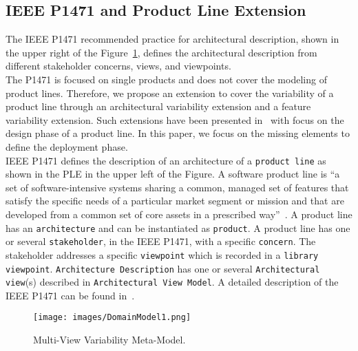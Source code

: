 \documentclass{llncs}
\begin{document}
\subsection{IEEE P1471 and Product Line Extension}
The IEEE P1471 recommended practice for architectural description, shown in the upper right of the Figure~\ref{MM}, defines the architectural description from different stakeholder concerns, views, and viewpoints.\\
The P1471 is focused on single products and does not cover the modeling of product lines. Therefore, we propose an extension to cover the variability of a product line through an architectural variability extension and a feature variability extension. Such extensions have been presented in~\cite{thiel2002systematic} with focus on the design phase of a product line. In this paper, we focus on the missing elements to define the deployment phase.\\
IEEE P1471 defines the description of an architecture of a \texttt{product line} as shown in the PLE in the upper left of the Figure. A software product line is ``a set of software-intensive systems sharing a common, managed set of features that satisfy the specific needs of a particular market segment or mission and that are developed from a common set of core assets in a prescribed way''~\cite{clements2002software}. A product line has an \texttt{architecture} and can be instantiated as \texttt{product}. A product line has one or several \texttt{stakeholder}, in the IEEE P1471, with a specific \texttt{concern}. The stakeholder addresses a specific \texttt{viewpoint} which is recorded in a \texttt{library viewpoint}. \texttt{Architecture Description} has one or several \texttt{Architectural view}(s) described in \texttt{Architectural View Model}. A detailed description of the IEEE P1471 can be found in~\cite{jacobson1999unified}.
\begin{figure}
	\centering%
	\texttt{[image: images/DomainModel1.png]}
	\caption{Multi-View Variability Meta-Model.}\label{MM}
\end{figure}
\end{document}
